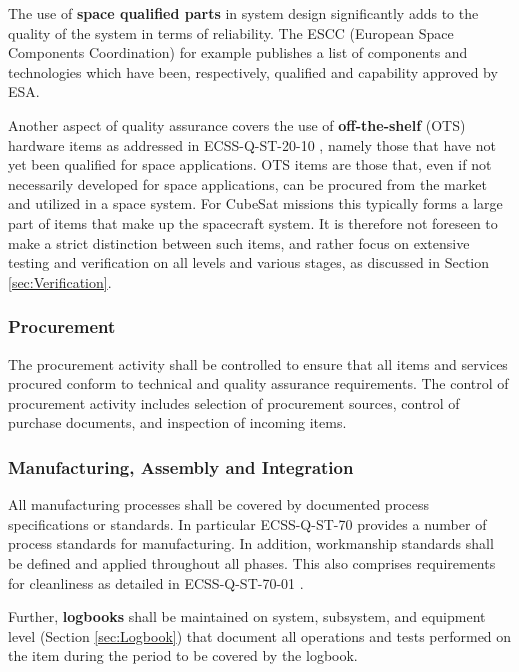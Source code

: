 The use of \textbf{space qualified parts} in system design significantly adds to the quality of the system in terms of reliability. The ESCC (European Space Components Coordination) for example publishes a list of components and technologies which have been, respectively, qualified and capability approved by ESA. \cite{spacecomponents.org}

Another aspect of quality assurance covers the use of \textbf{off-the-shelf} (OTS) hardware items as addressed in ECSS-Q-ST-20-10 \cite{ECSS-Q-ST-20-10}, namely those that have not yet been qualified for space applications. OTS items are those that, even if not necessarily developed for space applications, can be procured from the market and utilized in a space system. For CubeSat missions this typically forms a large part of items that make up the spacecraft system. It is therefore not foreseen to make a strict distinction between such items, and rather focus on extensive testing and verification on all levels and various stages, as discussed in Section \ref{sec:Verification}.

\subsubsection{Procurement}

The procurement activity shall be controlled to ensure that all items and services
procured conform to technical and quality assurance requirements. The control of procurement activity includes selection of procurement sources, control of purchase documents, and inspection of incoming items.

\subsubsection{Manufacturing, Assembly and Integration}

All manufacturing processes shall be covered by documented process specifications or standards. In particular ECSS-Q-ST-70 \cite{ECSS-Q-ST-70} provides a number of process standards for manufacturing. In addition, workmanship standards shall be defined and applied throughout all phases. This also comprises requirements for cleanliness as detailed in ECSS-Q-ST-70-01 \cite{ECSS-Q-ST-70-01}.

Further, \textbf{logbooks} shall be maintained on system, subsystem, and equipment level (Section \ref{sec:Logbook}) that document all operations and tests performed on the item during the period to be covered by the logbook.


